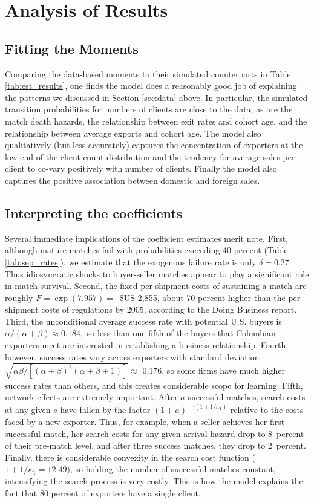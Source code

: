 \section{Analysis of Results}

\subsection{Fitting the Moments}

Comparing the data-based moments to their simulated counterparts in Table \ref{tab:est_results},
one finds the model does a reasonably good job of explaining the patterns we
discussed in Section \ref{sec:data} above. In particular, the simulated transition
probabilities for numbers of clients are close to the data, as are the match
death hazards, the relationship between exit rates and cohort age, and the
relationship between average exports and cohort age. The model also
qualitatively (but less accurately) captures the concentration of exporters
at the low end of the client count distribution and the tendency for average
sales per client to co-vary positively with number of clients. Finally the
model also captures the positive association between domestic and foreign
sales.

\subsection{Interpreting the coefficients}

Several immediate implications of the coefficient estimates merit note.
First, although mature matches fail with probabilities exceeding 40 percent
(Table \ref{tab:sep_rates}), we estimate that the exogenous failure rate is only $\delta =0.27$%
. Thus idiosyncratic shocks to buyer-seller matches appear to play a
significant role in match survival. Second, the fixed per-shipment costs of
sustaining a match are roughly $F=\exp (7.957)=$\ \$US 2,855, about 70 percent
higher than the per shipment costs of regulations by 2005, according to the
Doing Business report. Third, the unconditional average success rate with
potential U.S. buyers is \ $\alpha /(\alpha +\beta )\approx 0.184,$ so less
than one-fifth of the buyers that Colombian exporters meet are interested in
establishing a business relationship. Fourth, however, success rates vary
across exporters with standard deviation\ $\sqrt{\alpha \beta /\left[
(\alpha +\beta )^{2}(\alpha +\beta +1)\right] }\approx $ 0.176, so some
firms have much higher success rates than others, and this creates
considerable scope for learning. Fifth, network effects are extremely
important. After $a$ successful matches, search costs at any given $s$ have
fallen by the factor $(1+a)^{-\gamma (1+1/\kappa _{1})}$ relative to the
costs faced by a new exporter. Thus, for example, when a seller achieves her
first successful match, her search costs for any given arrival hazard drop
to 8\ percent of their pre-match level, and after three success matches,
they drop to $2$\ percent. Finally, there is considerable convexity in the
search cost function ($1+1/\kappa _{1}=12.49)$, so holding the number of
successful matches constant, intensifying the search process is very costly.
This is how the model explains the fact that 80 percent of exporters have a
single client.

